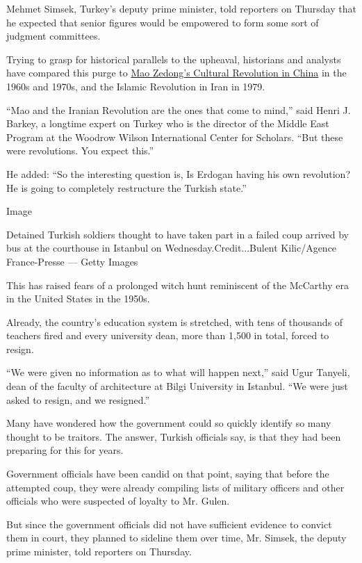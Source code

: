 Mehmet Simsek, Turkey's deputy prime minister, told reporters on
Thursday that he expected that senior figures would be empowered to form
some sort of judgment committees.

Trying to grasp for historical parallels to the upheaval, historians and
analysts have compared this purge to
\href{http://www.nytimes.com/2016/05/15/world/asia/china-cultural-revolution-explainer.html}{Mao
Zedong's Cultural Revolution in China} in the 1960s and 1970s, and the
Islamic Revolution in Iran in 1979.

``Mao and the Iranian Revolution are the ones that come to mind,'' said
Henri J. Barkey, a longtime expert on Turkey who is the director of the
Middle East Program at the Woodrow Wilson International Center for
Scholars. ``But these were revolutions. You expect this.''

He added: ``So the interesting question is, Is Erdogan having his own
revolution? He is going to completely restructure the Turkish state.''

Image

Detained Turkish soldiers thought to have taken part in a failed coup
arrived by bus at the courthouse in Istanbul on
Wednesday.Credit...Bulent Kilic/Agence France-Presse --- Getty Images

This has raised fears of a prolonged witch hunt reminiscent of the
McCarthy era in the United States in the 1950s.

Already, the country's education system is stretched, with tens of
thousands of teachers fired and every university dean, more than 1,500
in total, forced to resign.

``We were given no information as to what will happen next,'' said Ugur
Tanyeli, dean of the faculty of architecture at Bilgi University in
Istanbul. ``We were just asked to resign, and we resigned.''

Many have wondered how the government could so quickly identify so many
thought to be traitors. The answer, Turkish officials say, is that they
had been preparing for this for years.

Government officials have been candid on that point, saying that before
the attempted coup, they were already compiling lists of military
officers and other officials who were suspected of loyalty to Mr. Gulen.

But since the government officials did not have sufficient evidence to
convict them in court, they planned to sideline them over time, Mr.
Simsek, the deputy prime minister, told reporters on Thursday.

